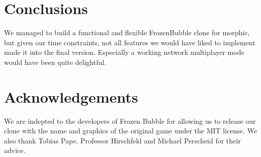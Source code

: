 \section{Conclusions}
We managed to build a functional and flexible FrozenBubble clone for morphic,
but given our time constraints, not all features we would have liked to implement
made it into the final version. Especially a working network multiplayer mode would
have been quite delightful.

\section*{Acknowledgements}
We are indepted to the developers of Frozen Bubble for allowing us to release 
our clone with the name and graphics of the original game under the MIT 
license. We also thank Tobias Pape, Professor Hirschfeld and Michael Perscheid for 
their advice.
